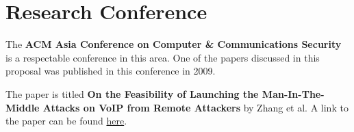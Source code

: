 \section{Research Conference}

The \textbf{ACM Asia Conference on Computer \& Communications Security} is a respectable conference in this area. One of the papers discussed in this proposal was published in this conference in 2009.

The paper is titled \textbf{On the Feasibility of Launching the Man-In-The-Middle
	Attacks on VoIP from Remote Attackers} by Zhang et al. A link to the paper can be found \href{https://www.csc2.ncsu.edu/faculty/xjiang4/pubs/ASIACCS09.pdf}{here}.